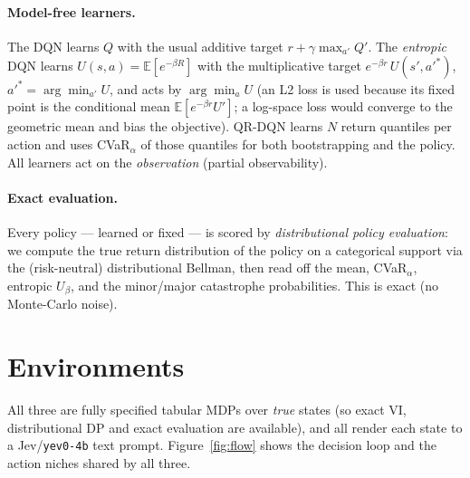 \documentclass[11pt]{article}
\newcommand{\Ubeta}{U_{\beta}}
\newcommand{\E}{\mathbb{E}}
\begin{document}
\paragraph{Model-free learners.} The DQN learns $Q$ with the usual additive target
$r+\gamma\max_{a'}Q'$. The \emph{entropic} DQN learns $U(s,a)=\E[e^{-\beta R}]$ with
the multiplicative target $e^{-\beta r}\,U(s',a'^*)$, $a'^*=\arg\min_{a'}U$, and
acts by $\arg\min_a U$ (an L2 loss is used because its fixed point is the
conditional mean $\E[e^{-\beta r}U']$; a log-space loss would converge to the
geometric mean and bias the objective). QR-DQN learns $N$ return quantiles per
action and uses CVaR$_\alpha$ of those quantiles for both bootstrapping and the
policy. All learners act on the \emph{observation} (partial observability).

\paragraph{Exact evaluation.} Every policy --- learned or fixed --- is scored by
\emph{distributional policy evaluation}: we compute the true return distribution of
the policy on a categorical support via the (risk-neutral) distributional Bellman,
then read off the mean, CVaR$_\alpha$, entropic $\Ubeta$, and the minor/major
catastrophe probabilities. This is exact (no Monte-Carlo noise).

\section{Environments}
All three are fully specified tabular MDPs over \emph{true} states (so exact VI,
distributional DP and exact evaluation are available), and all render each state to
a Jev/\texttt{yev0-4b} text prompt. Figure~\ref{fig:flow} shows the decision loop
and the action niches shared by all three.
\end{document}
